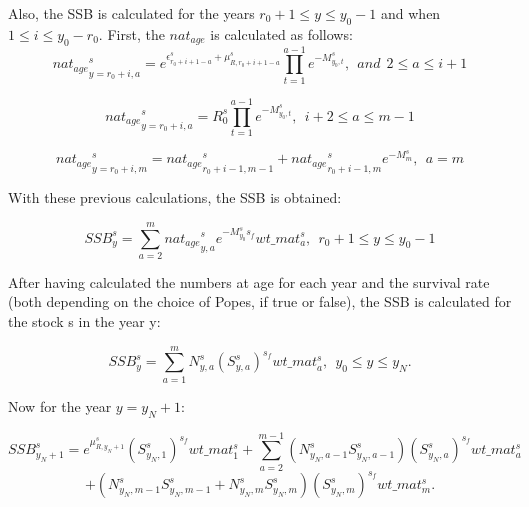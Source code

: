 \documentclass{article}
\begin{document}
\hfill

Also, the SSB is calculated for the years $r_0+1 \leq y \leq y_0 - 1$ and when $1\leq i \leq y_0-r_0$. First, the $nat_{age}$ is calculated as follows:\\

\begin{equation}
{nat_{age}}_{y=r_0+i,a}^s= e^{\epsilon^s_{r_0+i+1-a}+\mu^s_{R,r_0+i+1-a}}\prod_{t=1}^{a-1}e^{-M^s_{y_0,t}}, \ \ and \ \ 2\leq a \leq i+1
\end{equation}

\begin{equation}
{nat_{age}}_{y=r_0+i,a}^s=R^s_0\prod_{t=1}^{a-1}e^{-M^s_{y_0,t}}, \ \ i+2\leq  a \leq m-1
\end{equation}

\begin{equation}
{nat_{age}}_{y=r_0+i,m}^s={nat_{age}}_{r_0+i-1,m-1}^s
+{nat_{age}}_{r_0+i-1,m}^s e^{-M^s_{m}}, \ \ a=m
\end{equation}

With these previous calculations, the SSB is obtained:

\begin{equation}
    SSB^s_y=\sum_{a=2}^{m}{nat_{age}}_{y,a}^s e^{-M^s_{y_0}s_f} wt\_{mat}^s_a, \ \ r_0 + 1 \leq y \leq y_0 - 1
\end{equation}

After having calculated the numbers at age for each year and the survival rate (both depending on the choice of Popes, if true or false), the SSB is calculated for the stock s in the year y:

\begin{equation}
SSB^s_y=\sum_{a=1}^{m}N^s_{y,a}{(S^s_{y,a})}^{s_f}{wt\_{mat}}^s_a, \ \ y_0 \leq y \leq y_N.
\end{equation}


Now for the year $y=y_N+1$:

\begin{equation}
    SSB^s_{y_N+1}=e^{\mu^s_{R,y_N+1}}(S^{s}_{y_N,1})^{s_f}{wt\_{mat}}^s_1+\sum_{a=2}^{m-1}(N^{s}_{y_N,a-1}S^{s}_{y_N,a-1})(S^s_{y_N,a})^{s_f}wt\_{mat}^s_a
\end{equation}
\begin{equation*}
 +(N^{s}_{y_N,m-1}S^s_{y_N,m-1}+N^s_{y_N,m}S^s_{y_N,m})(S^s_{y_N,m})^{s_f}wt\_{mat}^s_{m}.
\end{equation*}
\end{document}
